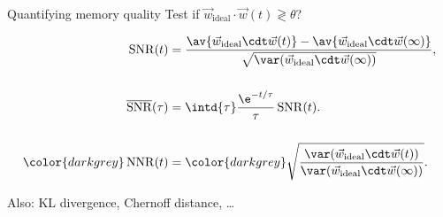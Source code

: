\documentclass[final]{beamer}%
\DeclareMathOperator{\snr}{SNR}
\newcommand{\snrb}{\overline{\snr}}
\newcommand{\syn}{\vec{w}}
\newcommand{\synid}{\syn_\text{ideal}}
\begin{document}
\begin{frame}{Quantifying memory quality}
%
 Test if $\synid \cdot \syn(t) \gtrless \theta$?


 \vp
 \parbox[t]{0.4\linewidth}{%
 }
 \parbox[t]{0.55\linewidth}{%
 \vspace{-\baselineskip}
 \begin{equation*}
   \begin{aligned}
     \snr(t) &= \frac{ \av{\synid\cdt\syn(t)} - \av{\synid\cdt\syn(\infty)} }{ \sqrt{\var(\synid\cdt\syn(\infty))}},
     \\[\baselineskip]
     \snrb(\tau) &= \intd{\tau} \frac{\e^{-t/\tau}}{\tau} \snr(t).
     \\[\baselineskip]
     \color{darkgrey} \operatorname{NNR}(t) &= \color{darkgrey} \sqrt{\frac{ \var(\synid\cdt\syn(t)) }{ \var(\synid\cdt\syn(\infty)) }}.
   \end{aligned}
 \end{equation*}
 }
 Also: KL divergence, Chernoff distance, \ldots
%
\end{frame}

\end{document}
